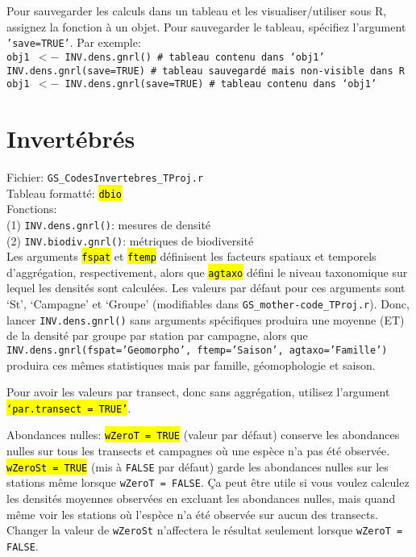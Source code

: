 \documentclass{article}
\begin{document}

Pour sauvegarder les calculs dans un tableau et les
visualiser/utiliser sous R, assignez la fonction à
un objet. Pour sauvegarder le tableau, spécifiez l'argument
\texttt{'save=TRUE'}. Par exemple: \\

\texttt{obj1 $<-$ INV.dens.gnrl() \# tableau contenu dans `obj1'}\\
\texttt{INV.dens.gnrl(save=TRUE) \# tableau sauvegardé mais non-visible dans R}\\
\texttt{obj1 $<-$ INV.dens.gnrl(save=TRUE) \# tableau contenu dans `obj1'}\\

\section{Invertébrés}

Fichier: \texttt{GS\_CodesInvertebres\_TProj.r}\\
Tableau formatté: \hl{\texttt{dbio}}\\
Fonctions:\\
\indent (1) \texttt{INV.dens.gnrl()}:  mesures de densité\\
\indent (2) \texttt{INV.biodiv.gnrl()}:  métriques de biodiversité\\

Les arguments \hl{\texttt{fspat}} et \hl{\texttt{ftemp}} définisent les facteurs
spatiaux et temporels d'aggrégation, respectivement, alors que
\hl{\texttt{agtaxo}} défini
le niveau taxonomique sur lequel les densités sont calculées. Les
valeurs par défaut pour ces arguments sont
`St', `Campagne' et `Groupe' (modifiables dans
\texttt{GS\_mother-code\_TProj.r}). Donc,
lancer \texttt{INV.dens.gnrl()} sans arguments spécifiques produira une moyenne (ET)
de la densité par groupe par station par campagne, alors que
\texttt{INV.dens.gnrl(fspat='Geomorpho', ftemp='Saison', agtaxo='Famille')}
produira ces mêmes statistiques mais par famille, géomophologie et
saison.

Pour avoir les valeurs par transect, donc sans aggrégation, utilisez
l'argument \hl{\texttt{`par.transect = TRUE'}}.

Abondances nulles: \hl{\texttt{wZeroT = TRUE}} (valeur par défaut) conserve
les abondances nulles sur tous les transects et campagnes où une
espèce n'a pas été observée. \hl{\texttt{wZeroSt = TRUE}} (mis à
\texttt{FALSE} par défaut) garde les abondances nulles sur les
stations même lorsque \texttt{wZeroT = FALSE}. Ça peut être utile si vous
voulez calculez les densités moyennes observées en excluant les
abondances nulles, mais quand même voir les stations où l'espèce n'a
été observée sur aucun des transects. Changer la valeur de
\texttt{wZeroSt} n'affectera le résultat seulement lorsque
\texttt{wZeroT = FALSE}.
\end{document}
